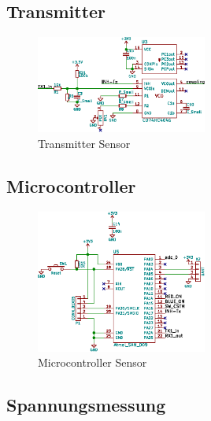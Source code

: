 \subsection{Transmitter}
\label{subsec:hw:sensor:transmitter}

\begin{figure}[h!t]
    \includegraphics[width=0.5\textwidth]{images/sensor-sch/sensor--sch--transmitter.eps}
    \caption{Transmitter Sensor}
\end{figure}



\subsection{Microcontroller}
\label{subsec:hw:sensor:mcu}

\begin{figure}[h!t]
    \includegraphics[width=0.5\textwidth]{images/sensor-sch/sensor--sch--mcu.eps}
    \caption{Microcontroller Sensor}
\end{figure}


\subsection{Spannungsmessung}
\label{subsec:hw:sensor:voltageSense}

